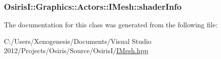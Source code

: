\hypertarget{class_osiris_i_1_1_graphics_1_1_actors_1_1_i_mesh_a372e7bb6ba6156e2aaad031338440ad1}{
\subsubsection[{shader\-Info}]{ Osiris\-I\-::\-Graphics\-::\-Actors\-::\-I\-Mesh\-::shader\-Info\hspace{0.3cm}{\ttfamily [protected]}}}\label{class_osiris_i_1_1_graphics_1_1_actors_1_1_i_mesh_a372e7bb6ba6156e2aaad031338440ad1}


The documentation for this class was generated from the following file\-:\begin{DoxyCompactItemize}
\item 
C\-:/\-Users/\-Xenogenesis/\-Documents/\-Visual Studio 2012/\-Projects/\-Osiris/\-Source/\-Osiris\-I/\hyperlink{_i_mesh_8hpp}{I\-Mesh.\-hpp}\end{DoxyCompactItemize}
